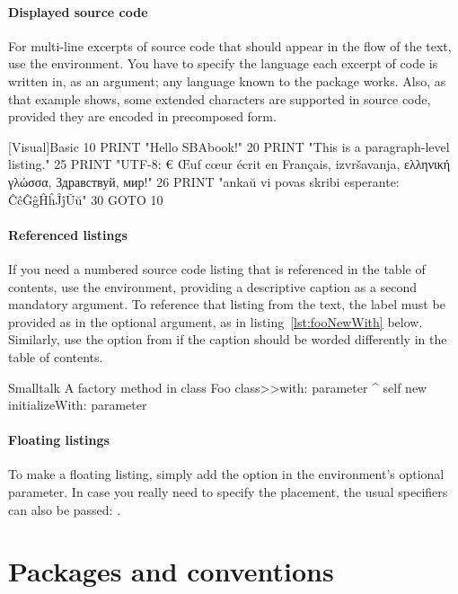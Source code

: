 \documentclass[twoside,openany,showtrims]{sbabook}
\begin{document}
\paragraph{Displayed source code}
For multi-line excerpts of source code that should appear in the flow of the
text, use the  environment.
You have to specify the language each excerpt of code is written in, as an
argument; any language known to the  package works.
Also, as that example shows, some extended characters are supported in source code, provided they are encoded in precomposed form.

\begin{displaycode}{[Visual]Basic}
10 PRINT "Hello SBAbook!"
20 PRINT "This is a paragraph-level listing."
25 PRINT "UTF-8: € Œuf cœur écrit en Français, izvršavanja, ελληνική γλώσσα, Здравствуй, мир!"
26 PRINT "ankaŭ vi povas skribi esperante: ĈĉĜĝĤĥĴĵŬŭ"
30 GOTO 10
\end{displaycode}


\paragraph{Referenced listings}
If you need a numbered source code listing that is referenced in the table of
contents, use the  environment, providing a descriptive caption as
a second mandatory argument.
To reference that listing from the text, the label must be provided as
 in the optional argument, as in
listing~\ref{lst:fooNewWith} below.
Similarly, use the  option from  if the caption
should be worded differently in the table of contents.

\begin{listing}[label=lst:fooNewWith]{Smalltalk}
{A factory method in class }
Foo class>>with: parameter
  ^ self new
    initializeWith: parameter
\end{listing}


\paragraph{Floating listings}
To make a floating listing, simply add the  option in the
environment's optional parameter.
In case you really need to specify the placement, the usual specifiers can also
be passed: .


\section{Packages and conventions}



\clearpage
\end{document}
